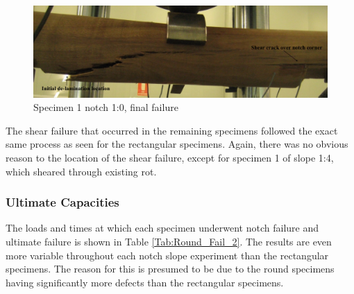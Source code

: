 \documentclass[11pt,a4paper]{article}
\numberwithin{equation}{subsection}
\begin{document}
\vspace*{\baselineskip}

\begin{figure}[h]
	\begin{center}
		\includegraphics[scale=0.4]{Shear_knot}
	\end{center}
	\caption{Specimen 1 notch 1:0, final failure}
	\label{fig:Shear_knot}
\end{figure}

\noindent
The shear failure that occurred in the remaining specimens followed the exact same process as seen for the rectangular specimens. Again, there was no obvious reason to the location of the shear failure, except for specimen 1 of slope 1:4, which sheared through existing rot. 

\subsubsection{Ultimate Capacities}
The loads and times at which each specimen underwent notch failure and ultimate failure is shown in Table \ref{Tab:Round_Fail_2}. The results are even more variable throughout each notch slope experiment than the rectangular specimens. The reason for this is presumed to be due to the round specimens having significantly more defects than the rectangular specimens.

\vspace*{\baselineskip}
\end{document}
